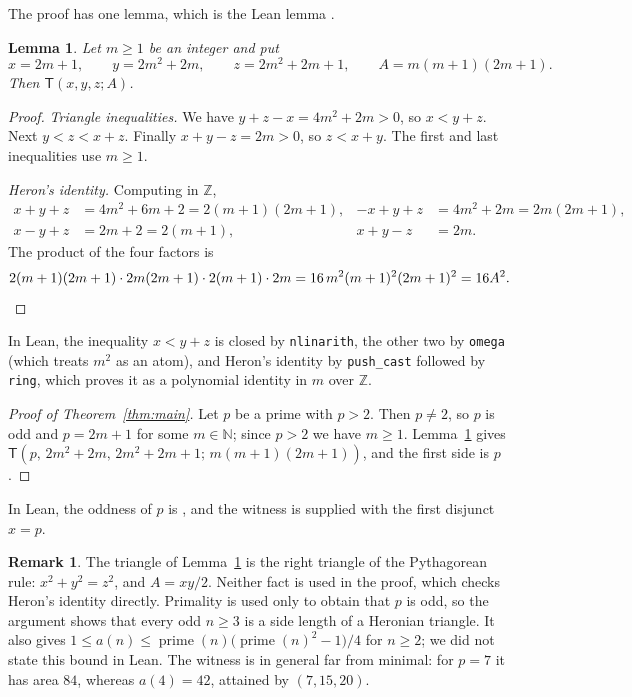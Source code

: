 \documentclass[11pt]{amsart}
\theoremstyle{plain}
\newtheorem{lemma}[theorem]{Lemma}
\theoremstyle{definition}
\newtheorem{remark}[theorem]{Remark}
\newcommand{\N}{\mathbb{N}}
\newcommand{\Z}{\mathbb{Z}}
\newcommand{\T}{\mathsf{T}}
\newcommand{\pr}{\operatorname{prime}}
\begin{document}
The proof has one lemma, which is the Lean lemma .

\begin{lemma}\label{lem:odd}
Let $m\ge1$ be an integer and put
\[
  x=2m+1,\qquad y=2m^2+2m,\qquad z=2m^2+2m+1,\qquad A=m(m+1)(2m+1).
\]
Then $\T(x,y,z;A)$.
\end{lemma}

\begin{proof}
\emph{Triangle inequalities.}
We have $y+z-x=4m^2+2m>0$, so $x<y+z$.
Next $y<z<x+z$.
Finally $x+y-z=2m>0$, so $z<x+y$.
The first and last inequalities use $m\ge1$.

\emph{Heron's identity.}
Computing in $\Z$,
\begin{align*}
  x+y+z &= 4m^2+6m+2 = 2(m+1)(2m+1), & -x+y+z &= 4m^2+2m = 2m(2m+1),\\
  x-y+z &= 2m+2 = 2(m+1), & x+y-z &= 2m.
\end{align*}
The product of the four factors is
\[
  2(m+1)(2m+1)\cdot 2m(2m+1)\cdot 2(m+1)\cdot 2m = 16\,m^2(m+1)^2(2m+1)^2 = 16A^2. \qedhere
\]
\end{proof}

In Lean, the inequality $x<y+z$ is closed by \texttt{nlinarith}, the other two by \texttt{omega} (which treats $m^2$ as an atom), and Heron's identity by \texttt{push\_cast} followed by \texttt{ring}, which proves it as a polynomial identity in $m$ over $\Z$.

\begin{proof}[Proof of Theorem~\ref{thm:main}]
Let $p$ be a prime with $p>2$.
Then $p\ne2$, so $p$ is odd and $p=2m+1$ for some $m\in\N$; since $p>2$ we have $m\ge1$.
Lemma~\ref{lem:odd} gives $\T(p,\,2m^2+2m,\,2m^2+2m+1;\,m(m+1)(2m+1))$, and the first side is $p$.
\end{proof}

In Lean, the oddness of $p$ is , and the witness is supplied with the first disjunct $x=p$.

\begin{remark}
The triangle of Lemma~\ref{lem:odd} is the right triangle of the Pythagorean rule: $x^2+y^2=z^2$, and $A=xy/2$.
Neither fact is used in the proof, which checks Heron's identity directly.
Primality is used only to obtain that $p$ is odd, so the argument shows that every odd $n\ge3$ is a side length of a Heronian triangle.
It also gives $1\le a(n)\le \pr(n)\bigl(\pr(n)^2-1\bigr)/4$ for $n\ge2$; we did not state this bound in Lean.
The witness is in general far from minimal: for $p=7$ it has area $84$, whereas $a(4)=42$, attained by $(7,15,20)$.
\end{remark}
\end{document}
